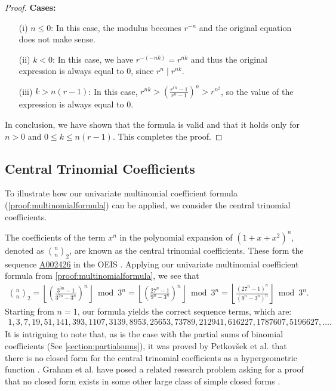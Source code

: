 \documentclass{article}
\theoremstyle{plain}
\newcommand{\floor}[1]{\left\lfloor #1 \right\rfloor}
\newcommand{\seqnum}[1]{\href{https://oeis.org/#1}{\rm \underline{#1}}}
\begin{document}
\begin{proof}
\textbf{Cases:}
\begin{enumerate}
    \item[(i)] $n \leq 0$: In this case, the modulus becomes $r^{-n}$ and the original equation does not make sense.
    \item[(ii)] $k < 0$: In this case, we have $r^{-(-nk)} = r^{nk}$ and thus the original expression is always equal to $0$, since $r^{n} \mid r^{nk}$.
    \item[(iii)] $k > n (r-1)$: In this case, $r^{nk} > \left(\frac{r^{rn} - 1}{r^{n} - 1}\right)^{n} > r^{n^2}$, so the value of the expression is always equal to $0$.
\end{enumerate}

In conclusion, we have shown that the formula is valid and that it holds only for $n > 0$ and $0 \leq k \leq n(r-1)$. This completes the proof.
\end{proof}

\subsection{Central Trinomial Coefficients}
To illustrate how our univariate multinomial coefficient formula (\cref{proof:multinomialformula}) can be applied, we consider the central trinomial coefficients.

The coefficients of the term $x^n$ in the polynomial expansion of $(1+x+x^2)^n$, denoted as $\binom{n}{n}_2$, are known as the central trinomial coefficients. These form the sequence \seqnum{A002426} in the OEIS \cite{A002426}. Applying our univariate multinomial coefficient formula from \cref{proof:multinomialformula}, we see that
\begin{align*}
    \binom{n}{n}_2 = \floor{\left(\frac{3^{3n} - 1}{3^{2n} - 3^n}\right)^n} \bmod 3^n
    = \floor{\left(\frac{27^n - 1}{9^n - 3^n}\right)^n} \bmod 3^n 
    = \floor{\frac{(27^n - 1)^n}{(9^n - 3^n)^n}} \bmod 3^n .
\end{align*}
Starting from $n=1$, our formula yields the correct sequence terms, which are:
\begin{align*}
1,3,7,19,51,141,393,1107,3139,8953,25653,73789,212941,616227,1787607,5196627, \ldots .
\end{align*}
It is intriguing to note that, as is the case with the partial sums of binomial coefficients (See \cref{section:partialsums}), it was proved by Petkovšek et al. that there is no closed form for the central trinomial coefficients as a hypergeometric function \cite{petkovsek1996ab}. Graham et al. have posed a related research problem asking for a proof that no closed form exists in some other large class of simple closed forms \cite{graham1994concrete}.
\end{document}
